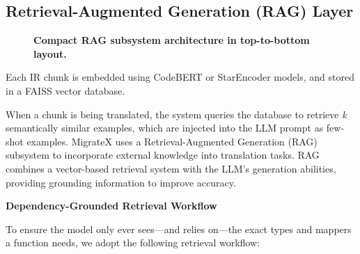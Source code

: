 \documentclass[twocolumn]{article}
\begin{document}
\subsection{Retrieval-Augmented Generation (RAG) Layer}
\begin{figure}[htbp]
    \centering
    \caption{\textbf{Compact RAG subsystem architecture in top-to-bottom layout.}}
    \label{fig:rag_compact}
    \end{figure}
    
    

Each IR chunk is embedded using CodeBERT or StarEncoder models, and stored in a FAISS vector database.

When a chunk is being translated, the system queries the database to retrieve \emph{k} semantically similar examples, which are injected into the LLM prompt as few-shot examples.
MigrateX uses a Retrieval-Augmented Generation (RAG) subsystem to incorporate external knowledge into translation tasks. RAG combines a vector-based retrieval system with the LLM’s generation abilities, providing grounding information to improve accuracy.

\textbf{Dependency-Grounded Retrieval Workflow}
\label{subsubsec:grounded-workflow}

To ensure the model only ever sees—and relies on—the exact types and mappers a function needs, we adopt the following retrieval workflow:
\end{document}
